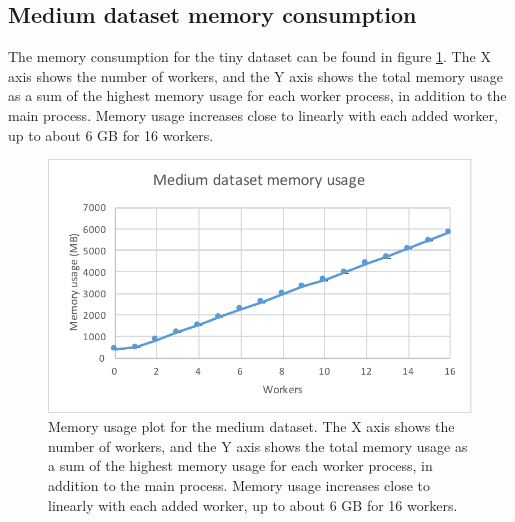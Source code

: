 \subsection{Medium dataset memory consumption}
The memory consumption for the tiny dataset can be found in figure \ref{fig:dataset_3_memory}.
The X axis shows the number of workers, and the Y axis shows the total memory usage as
a sum of the highest memory usage for each worker process, in addition to the main process. Memory usage increases close to linearly with each added worker,
up to about 6 GB for 16 workers.
\begin{figure}[ht]
  \centering
  \includegraphics[width=120mm]{figures/dataset_3/dataset_3_memory.pdf}
  \caption[Memory usage plot for the medium dataset.]{Memory usage plot for the medium dataset. The X axis shows the number of workers, and the Y axis shows the total memory usage as
  a sum of the highest memory usage for each worker process, in addition to the main process. Memory usage increases close to linearly with each added worker,
  up to about 6 GB for 16 workers.}
  \label{fig:dataset_3_memory}
\end{figure}

